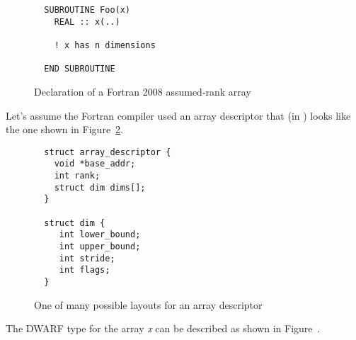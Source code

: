\begin{figure}[!ht]
\begin{lstlisting}
  SUBROUTINE Foo(x)
    REAL :: x(..)

    ! x has n dimensions
  
  END SUBROUTINE
\end{lstlisting}
\caption{Declaration of a Fortran 2008 assumed-rank array}
\label{fig:assumedrankdecl}
\end{figure}

Let's assume the Fortran compiler used an array descriptor that
(in ) looks
like the one shown in Figure~\ref{fig:arraydesc}.

\begin{figure}[!ht]
\begin{lstlisting}
  struct array_descriptor {
    void *base_addr;
    int rank;
    struct dim dims[]; 
  }

  struct dim {
     int lower_bound;
     int upper_bound;
     int stride;
     int flags;
  }
\end{lstlisting}
\caption{One of many possible layouts for an array descriptor}
\label{fig:arraydesc}
\end{figure}

The DWARF type for the array \emph{x} can be described as shown in
Figure~.

